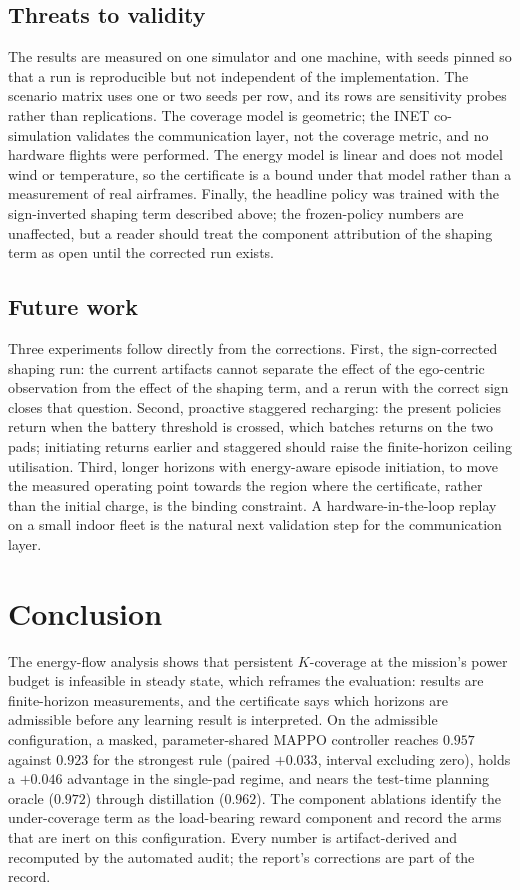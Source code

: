 \documentclass[conference]{IEEEtran}
\begin{document}
\subsection{Threats to validity}
The results are measured on one simulator and one machine, with seeds pinned so that a run is reproducible but not independent of the implementation. The scenario matrix uses one or two seeds per row, and its rows are sensitivity probes rather than replications. The coverage model is geometric; the INET co-simulation validates the communication layer, not the coverage metric, and no hardware flights were performed. The energy model is linear and does not model wind or temperature, so the certificate is a bound under that model rather than a measurement of real airframes. Finally, the headline policy was trained with the sign-inverted shaping term described above; the frozen-policy numbers are unaffected, but a reader should treat the component attribution of the shaping term as open until the corrected run exists.

\subsection{Future work}
Three experiments follow directly from the corrections. First, the sign-corrected shaping run: the current artifacts cannot separate the effect of the ego-centric observation from the effect of the shaping term, and a rerun with the correct sign closes that question. Second, proactive staggered recharging: the present policies return when the battery threshold is crossed, which batches returns on the two pads; initiating returns earlier and staggered should raise the finite-horizon ceiling utilisation. Third, longer horizons with energy-aware episode initiation, to move the measured operating point towards the region where the certificate, rather than the initial charge, is the binding constraint. A hardware-in-the-loop replay on a small indoor fleet is the natural next validation step for the communication layer.

\section{Conclusion}
The energy-flow analysis shows that persistent $K$-coverage at the mission's power budget is infeasible in steady state, which reframes the evaluation: results are finite-horizon measurements, and the certificate says which horizons are admissible before any learning result is interpreted. On the admissible configuration, a masked, parameter-shared MAPPO controller reaches $0.957$ against $0.923$ for the strongest rule (paired $+0.033$, interval excluding zero), holds a $+0.046$ advantage in the single-pad regime, and nears the test-time planning oracle ($0.972$) through distillation ($0.962$). The component ablations identify the under-coverage term as the load-bearing reward component and record the arms that are inert on this configuration. Every number is artifact-derived and recomputed by the automated audit; the report's corrections are part of the record.
\end{document}

